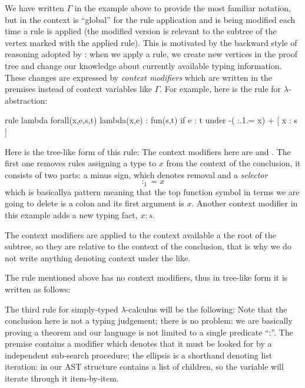 We have written $\Gamma$ in the example above to provide the most familiar notation, but in \Tcg{} the context is ``global'' for the rule application and is being modified each time a rule is applied (the modified version is relevant to the subtree of the vertex marked with the applied rule). This is motivated by the backward style of reasoning adopted by \Tcg{}: when we apply a rule, we create new vertices in the proof tree and change our knowledge about currently available typing information. These changes are expressed by \emph{context modifiers} which are written in the premises instead of context variables like $\Gamma$. For example, here is the rule for $\lambda$-abstraction:
\begin{code}
rule lambda
forall(x,e,s,t)
lambda(x,e) : fun(s,t)
if e : t
under -( :.1.= x) + [ x : s ]
\end{code}
Here is the tree-like form of this rule:
The context modifiers here are  and \code{+[ x : s ]}. The first one removes rules assigning a type to $x$ from the context of the conclusion, it consists of two parts: a minus sign, which denotes removal and a \emph{selector}
$$:_1 = x$$
which is basicallya pattern meaning that the top function symbol in terms we are going to delete is a colon and its first argument is $x$. Another context modifier in this example adds a new typing fact, $x : s$.

The context modifiers are applied to the context available a the root of the subtree, so they are relative to the context of the conclusion, that is why we do not write anything denoting context under the like.

The rule  mentioned above has no context modifiers, thus in tree-like form it is written as follows:

The third rule for simply-typed $\lambda$-calculus will be the following:
Note that the conclusion here is not a typing judgement; there is no problem: we are basically proving a theorem and our language is not limited to a single predicate ``:''. The premise contains a \code{[branch]} modifier which denotes that it must be looked for by a independent sub-search procedure; the ellipsis  is a shorthand denoting list iteration: in our AST structure  contains a list of children, so the  variable will iterate through it item-by-item.

